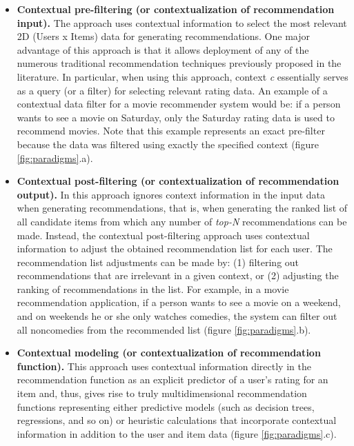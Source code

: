 \begin{itemize}
\item \textbf{Contextual pre-filtering (or contextualization of
recommendation input).} The approach uses contextual information to
select the most relevant 2D (Users x Items) data for generating
recommendations. One major advantage of this approach is that it
allows deployment of any of the numerous traditional recommendation
techniques previously proposed in the literature\cite{adomavicius2005toward}.
In particular, when using this approach, context
\textit{c} essentially serves as a query (or a filter) for selecting
relevant rating data. An example of a contextual data filter for a
movie recommender system would be: if a person wants to see a movie on
Saturday, only the Saturday rating data is used to recommend movies.
Note that this example represents an exact pre-filter because the data
was filtered using exactly the specified context (figure
\ref{fig:paradigms}.a).
\item \textbf{Contextual post-filtering (or contextualization of
recommendation output).} In this approach ignores context information
in the input data when generating recommendations, that is, when
generating the ranked list of all candidate items from which any
number of \textit{top-N} recommendations can be made. Instead,  the
contextual post-filtering approach uses contextual information to
adjust the obtained recommendation list for each user. The
recommendation list adjustments can be made by: (1) filtering out
recommendations that are irrelevant in a given context, or (2)
adjusting the ranking of recommendations in the list. For example, in
a movie recommendation application, if a person wants to see a movie
on a weekend, and on weekends he or she only watches comedies, the
system can filter out all noncomedies from the recommended list
(figure \ref{fig:paradigms}.b).
\item \textbf{Contextual modeling (or contextualization of
recommendation function).} This approach uses contextual information
directly in the recommendation function as an explicit predictor of a
user's rating for an item and, thus, gives rise to truly
multidimensional recommendation functions representing either
predictive models (such as decision trees, regressions, and so on) or
heuristic calculations that incorporate contextual information in
addition to the user and item data (figure \ref{fig:paradigms}.c).\\
\end{itemize}
